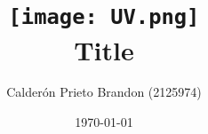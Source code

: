 \title{
	\texttt{[image: UV.png]} \\[1cm]
	Title
}
\author{
	Calderón Prieto Brandon (2125974)
}
\date{\today}
